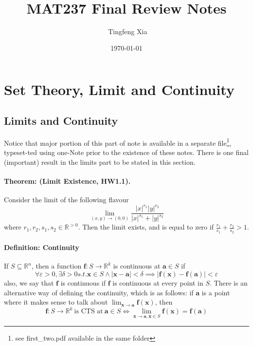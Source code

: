\documentclass[11pt]{article}
\title{MAT237 Final Review Notes}
\author{\ccLogo \,\,Tingfeng Xia}
\date{\today}
\newcommand{\real}{\mathbb{R}}
\newcommand{\va}{\mathbf{a}}
\newcommand{\vx}{\mathbf{x}}
\newcommand{\ba}{\mathbf{a}}
\newcommand{\boldf}{\mathbf{f}}
\begin{document}
\maketitle
\doclicenseThis
\tableofcontents
\newpage

\section{Set Theory, Limit and Continuity}
\subsection{Limits and Continuity}
Notice that major portion of this part of note is available in a separate file\footnote{see first\_two.pdf available in the same folder}, typeset-ted using one-Note prior to the existence of these notes. There is one final (important) result in the limits part to be stated in this section.
\paragraph{Theorem: (Limit Existence, HW1.1).} Consider the limit of the following flavour
\begin{equation*}
    \lim_{(x,y)\rightarrow{}(0,0)} \frac{|x|^{r_1}|y|^{r_2}}{|x|^{s_1} + |y|^{s_2}}
\end{equation*}
where $r_1,r_2,s_1,s_2\in \real^{>0}$. Then the limit exists, and is equal to zero if $\frac{r_1}{s_1} + \frac{r_2}{s_2} > 1$.
\paragraph{Definition: Continuity} If $S\subseteq \real^n$, then a function $\mathbf{f}: {S}\rightarrow{}{\real^k}$ is continuous at $\ba\in S$ if
\begin{equation*}
    \forall \varepsilon > 0, \exists \delta >0 s.t. \vx\in S \land |\vx-\va|< \delta \implies |\boldf(\vx) - \boldf(\va)|<\varepsilon
\end{equation*}
also, we say that $\boldf$ is continuous if $\boldf$ is continuous at every point in $S$. There is an alternative way of defining the continuity, which is as follows: if $\va$ is a point where it makes sense to talk about $\lim_{\vx\rightarrow{}\va}\boldf(\vx)$, then
\begin{equation*}
    \boldf:S\rightarrow{}\real^k~\text{is CTS at}~\va\in S\iff \lim_{\vx\rightarrow{}\va,\vx\in S} \boldf(\vx) = \boldf(\va)
\end{equation*}
\end{document}
